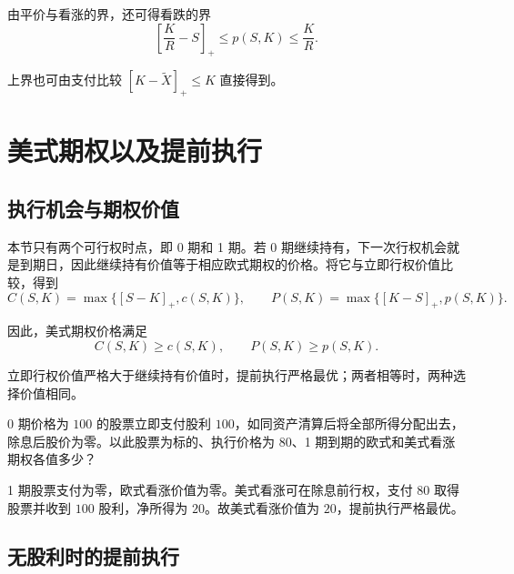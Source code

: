 \begin{tcolorbox}[knowledge,title=欧式看跌的价格界]
由平价与看涨的界，还可得看跌的界
\[
 \left[\frac K R-S\right]_+\le p(S,K)\le\frac K R.
\]

上界也可由支付比较 $[K-\tilde X]_+\le K$ 直接得到。
\end{tcolorbox}

\section{美式期权以及提前执行}\label{sec:wj-five-early}
\subsection{执行机会与期权价值}
\begin{tcolorbox}[knowledge,title=两时点模型的最优执行]
本节只有两个可行权时点，即 0 期和 1 期。若 0 期继续持有，下一次行权机会就是到期日，因此继续持有价值等于相应欧式期权的价格。将它与立即行权价值比较，得到
\[
 C(S,K)=\max\{[S-K]_+,c(S,K)\},\qquad
 P(S,K)=\max\{[K-S]_+,p(S,K)\}.
\]

因此，美式期权价格满足
\begin{equation}
 C(S,K)\ge c(S,K),\qquad P(S,K)\ge p(S,K).
 \label{eq:wj-five-4}
\end{equation}

立即行权价值严格大于继续持有价值时，提前执行严格最优；两者相等时，两种选择价值相同。
\end{tcolorbox}

\begin{tcolorbox}[example]
\begin{question}
0 期价格为 $100$ 的股票立即支付股利 $100$，如同资产清算后将全部所得分配出去，除息后股价为零。以此股票为标的、执行价格为 $80$、1 期到期的欧式和美式看涨期权各值多少？
\end{question}
\begin{solution}
1 期股票支付为零，欧式看涨价值为零。美式看涨可在除息前行权，支付 $80$ 取得股票并收到 $100$ 股利，净所得为 $20$。故美式看涨价值为 $20$，提前执行严格最优。
\end{solution}
\end{tcolorbox}

\subsection{无股利时的提前执行}

